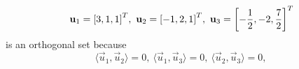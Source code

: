 \begin{example}
    $$ \vec{u}_1 = \transp{[3, 1, 1]},\ \vec{u}_2 = \transp{[-1, 2, 1]},\ \vec{u}_3 = \transp{\left[ -\frac{1}{2}, -2, \frac{7}{2} \right]} $$
    is an orthogonal set because
    $$ \langle\vec{u}_1, \vec{u}_2\rangle = 0,\ \langle\vec{u}_1, \vec{u}_3\rangle = 0,\ \langle\vec{u}_2, \vec{u}_3\rangle = 0,\  $$
\end{example}